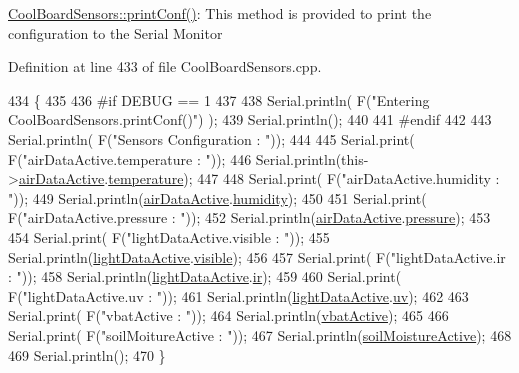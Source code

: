 \hyperlink{class_cool_board_sensors_af6fd79505815b204c178617ecf54c873}{Cool\+Board\+Sensors\+::print\+Conf()}\+: This method is provided to print the configuration to the Serial Monitor 

Definition at line 433 of file Cool\+Board\+Sensors.\+cpp.


\begin{DoxyCode}
434 \{
435 
436 \textcolor{preprocessor}{#if DEBUG == 1}
437 
438     Serial.println( F(\textcolor{stringliteral}{"Entering CoolBoardSensors.printConf()"}) );
439     Serial.println();
440 
441 \textcolor{preprocessor}{#endif}
442 
443     Serial.println( F(\textcolor{stringliteral}{"Sensors Configuration : "}));
444     
445     Serial.print( F(\textcolor{stringliteral}{"airDataActive.temperature : "}));
446     Serial.println(this->\hyperlink{class_cool_board_sensors_abff8dfeccb2f7689847bb64d5f1cd31e}{airDataActive}.\hyperlink{struct_cool_board_sensors_1_1air_active_ac08576736c7ac3bfbfec32e5ee17c686}{temperature});
447 
448     Serial.print( F(\textcolor{stringliteral}{"airDataActive.humidity : "}));
449     Serial.println(\hyperlink{class_cool_board_sensors_abff8dfeccb2f7689847bb64d5f1cd31e}{airDataActive}.\hyperlink{struct_cool_board_sensors_1_1air_active_ab69738e9fd1c2ba80dc666bcd1e116f7}{humidity});
450 
451     Serial.print( F(\textcolor{stringliteral}{"airDataActive.pressure : "}));
452     Serial.println(\hyperlink{class_cool_board_sensors_abff8dfeccb2f7689847bb64d5f1cd31e}{airDataActive}.\hyperlink{struct_cool_board_sensors_1_1air_active_a15932ccfb6ee6603713d937ec9b76b72}{pressure});
453 
454     Serial.print( F(\textcolor{stringliteral}{"lightDataActive.visible : "}));
455     Serial.println(\hyperlink{class_cool_board_sensors_ac4deb1cf41bac8b91c780c92fab00ba4}{lightDataActive}.\hyperlink{struct_cool_board_sensors_1_1light_active_a9c351100969d0dc055ad2e6712cc7ac8}{visible});
456 
457     Serial.print( F(\textcolor{stringliteral}{"lightDataActive.ir : "}));
458     Serial.println(\hyperlink{class_cool_board_sensors_ac4deb1cf41bac8b91c780c92fab00ba4}{lightDataActive}.\hyperlink{struct_cool_board_sensors_1_1light_active_a4c21258d3c89c6292740d6deb10f9dcc}{ir});
459 
460     Serial.print( F(\textcolor{stringliteral}{"lightDataActive.uv : "}));
461     Serial.println(\hyperlink{class_cool_board_sensors_ac4deb1cf41bac8b91c780c92fab00ba4}{lightDataActive}.\hyperlink{struct_cool_board_sensors_1_1light_active_a0e6cfc311425a31f32c32fc3b834ffb8}{uv});
462     
463     Serial.print( F(\textcolor{stringliteral}{"vbatActive : "}));
464     Serial.println(\hyperlink{class_cool_board_sensors_ab0b4bbae83796b52b90f91008d383583}{vbatActive});
465 
466     Serial.print( F(\textcolor{stringliteral}{"soilMoitureActive : "}));
467     Serial.println(\hyperlink{class_cool_board_sensors_ae7971bf527781ac4994309591b78ab89}{soilMoistureActive});
468 
469     Serial.println();
470 \}
\end{DoxyCode}
